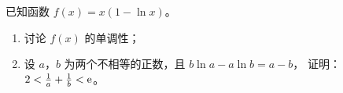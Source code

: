 \documentclass[zihao = -4]{exam-zh}
\begin{document}
\begin{problem}[points = 12]
  已知函数 $f(x) = x (1 - \ln x)$。
  \begin{enumerate}
    \item 讨论 $f(x)$ 的单调性；
    \item 设 $a$，$b$ 为两个不相等的正数，且 $b \ln a - a \ln b = a - b$，
      证明：$2 < \frac{1}{a} + \frac{1}{b} < \mathrm{ e }$。
  \end{enumerate}
\end{problem}

\zhlipsum[1-6]
\zhlipsum[1-6]
\zhlipsum[1-6]
\zhlipsum[1-6]
\zhlipsum[1-6]
\end{document}
